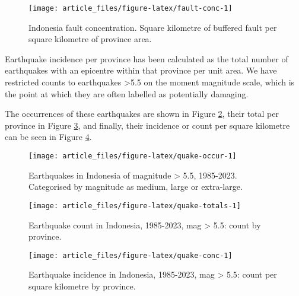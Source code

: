 \begin{figure}

{\centering \texttt{[image: article\_files/figure-latex/fault-conc-1]} 

}

\caption{Indonesia fault concentration. Square kilometre of buffered fault per square kilometre of province area. }\label{fig:fault-conc}
\end{figure}

Earthquake incidence per province has been calculated as the total number of earthquakes with
an epicentre within that province per unit area. We have
restricted counts to earthquakes \textgreater5.5 on the moment magnitude scale, which is the point
at which they are often labelled as potentially damaging.

The occurrences of these earthquakes are shown in Figure \ref{fig:quake-occur}, their total per province in Figure \ref{fig:quake-totals}, and finally, their incidence or count per square kilometre can be seen in Figure \ref{fig:quake-conc}.

\begin{figure}

{\centering \texttt{[image: article\_files/figure-latex/quake-occur-1]} 

}

\caption{Earthquakes in Indonesia of magnitude > 5.5, 1985-2023. Categorised by magnitude as medium, large or extra-large. }\label{fig:quake-occur}
\end{figure}

\begin{figure}

{\centering \texttt{[image: article\_files/figure-latex/quake-totals-1]} 

}

\caption{Earthquake count in Indonesia, 1985-2023, mag > 5.5: count by province. }\label{fig:quake-totals}
\end{figure}

\begin{figure}

{\centering \texttt{[image: article\_files/figure-latex/quake-conc-1]} 

}

\caption{Earthquake incidence in Indonesia, 1985-2023, mag > 5.5: count per square kilometre by province. }\label{fig:quake-conc}
\end{figure}

